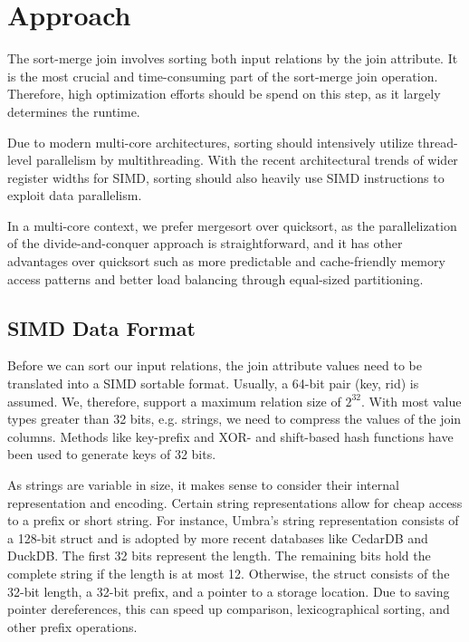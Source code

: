\section{Approach}
\label{sec:approach}


The sort-merge join involves sorting both input relations by the join attribute. It is the most crucial and 
time-consuming part of the sort-merge join operation. Therefore, high optimization efforts should
be spend on this step, as it largely determines the runtime. 

Due to modern multi-core 
architectures, sorting should intensively utilize thread-level parallelism by multithreading.
With the recent architectural trends of wider register widths for SIMD, sorting should also
heavily use SIMD instructions to exploit data parallelism. 

In a multi-core context, we prefer mergesort over quicksort, as the parallelization of the divide-and-conquer approach
is straightforward, and it has other advantages over quicksort such as more predictable and 
cache-friendly memory access patterns and better load balancing through equal-sized partitioning. 

\subsection{SIMD Data Format}
Before we can sort our input relations, the join attribute values need to be translated into a SIMD sortable
format. Usually, a 64-bit pair (key, rid) is assumed. We, therefore,
support a maximum relation size of $2^{32}$. With most value types greater
than 32 bits, e.g. strings, we need to compress the values of the join columns. Methods like 
key-prefix \cite{chris_nyberg__1994} and XOR- and shift-based hash functions \cite{1319989} have 
been used to generate keys of 32 bits.

As strings are variable in size, it makes sense to consider their internal representation and
encoding. Certain string representations allow for cheap access to a prefix or short string.
For instance, Umbra's string representation \cite{DBLP:conf/cidr/NeumannF20} consists of a 128-bit 
struct and is adopted by more recent databases like CedarDB and DuckDB. The first 32 bits represent 
the length. The remaining bits hold
the complete string if the length is at most 12. Otherwise, the struct consists of the 32-bit
length, a 32-bit prefix, and a pointer to a storage location. Due to saving pointer dereferences,
this can speed up comparison, lexicographical sorting, and other prefix operations.



